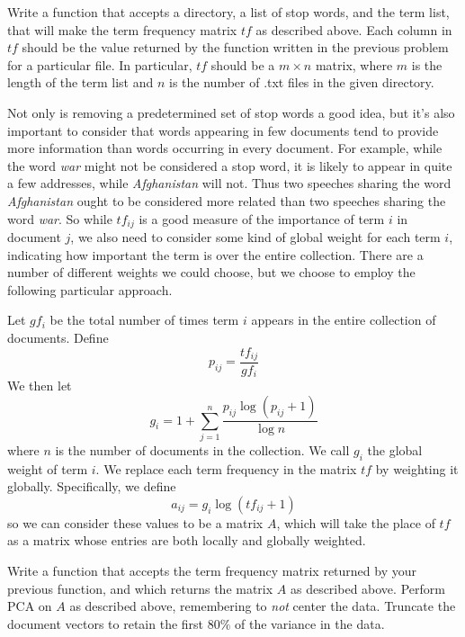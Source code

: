 \begin{problem}
Write a function that accepts a directory, a list of stop words, and the term list, 
that will make the term frequency matrix $t\!f$ as described above. 
Each column in $t\!f$ should be the value returned by the function written in the 
previous problem for a particular file. In particular, $t\!f$ should be a 
$m \times n$ matrix, where $m$ is the length of the term list and 
$n$ is the number of .txt files in the given directory.
\end{problem}

Not only is removing a predetermined set of stop words a good idea, 
but it's also important to consider that words appearing in few documents tend 
to provide more information than words occurring in every document. 
For example, while the word \emph{war} might not be considered a stop word, 
it is likely to appear in quite a few addresses, while \emph{Afghanistan} will not. 
Thus two speeches sharing the word \emph{Afghanistan} ought to be considered more 
related than two speeches sharing the word \emph{war}. 
So while $t\!f_{ij}$ is a good measure of the importance of term $i$ in document $j$, 
we also need to consider some kind of global weight for each term $i$, 
indicating how important the term is over the entire collection. 
There are a number of different weights we could choose, but we choose to employ 
the following particular approach.

Let $g\!f_{i}$ be the total number of times term $i$ appears in the entire 
collection of documents. 
Define 
\begin{equation*}
p_{ij} = \frac{t\!f_{ij}}{g\!f_{i}}
\end{equation*}
We then let 
\begin{equation*}
g_{i} = 1 + \sum_{j=1}^{n} \frac{p_{ij} \log (p_{ij} + 1)}{\log n}
\end{equation*}
where $n$ is the number of documents in the collection. 
We call $g_{i}$ the global weight of term $i$. 
We replace each term frequency in the matrix $tf$ by weighting it globally. 
Specifically, we define 
\begin{equation*}
a_{ij} = g_{i} \log (t\!f_{ij} + 1)
\end{equation*}
so we can consider these values to be a matrix $A$, which will take the place of 
$tf$ as a matrix whose entries are both locally and globally weighted.

\begin{problem}
Write a function that accepts the term frequency matrix returned by your previous 
function, and which returns the matrix $A$ as described above. 
Perform PCA on $A$ as described above, remembering to \emph{not} center the data. 
Truncate the document vectors to retain the first $80\%$ of the variance in the data.
\end{problem}

